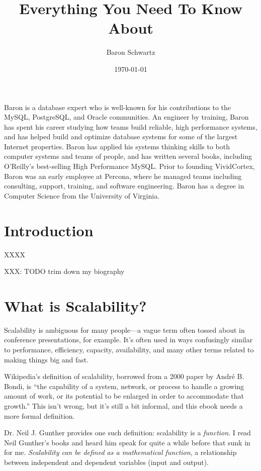 \documentclass{vivid_layout}
\title{Everything You Need To Know About}{Scalability}
\date{\today}
\author{Baron Schwartz}{img/baron}
\begin{document}
\maketitle		%
\begin{bio}		%
Baron is a database expert who is well-known for his contributions to the MySQL, PostgreSQL, and Oracle communities. An engineer by training, Baron has spent his career studying how teams build reliable, high performance systems, and has helped build and optimize database systems for some of the largest Internet properties. Baron has applied his systems thinking skills to both computer systems and teams of people, and has written several books, including O'Reilly's best-selling High Performance MySQL. Prior to founding VividCortex, Baron was an early employee at Percona, where he managed teams including consulting, support, training, and software engineering. Baron has a degree in Computer Science from the University of Virginia.
\end{bio}
\tableofcontents	%

\section{Introduction}

XXXX

XXX: TODO trim down my biography

\section{What is Scalability?}

Scalability is ambiguous for many people---a vague term often tossed about in
conference presentations, for example. It's often used in ways confusingly
similar to performance, efficiency, capacity, availability, and many other terms
related to making things big and fast.

Wikipedia's definition of scalability, borrowed from a 2000 paper by Andr\'e B.
Bondi, is ``the capability of a system, network, or process to
handle a growing amount of work, or its potential to be enlarged in order to
accommodate that growth.'' This isn't wrong, but it's still a bit informal, and
this ebook needs a more formal definition.

Dr. Neil J. Gunther provides one such definition: scalability is a {\itshape
function}. I read Neil Gunther's books and heard him speak for quite a while
before that sunk in for me. {\itshape Scalability can be defined as a
mathematical function}, a relationship between independent and dependent
variables (input and output).
\end{document}

